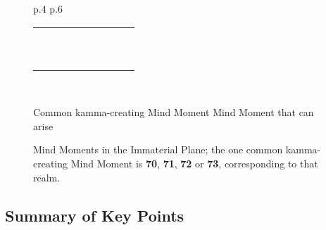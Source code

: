 \begin{figure}[H]
\begin{tabular}{L{\dimexpr.4\tabcolsep} R{\dimexpr.6\tabcolsep}}
\begin{tabular}{p{} p{}
p{}
R{.077\textwidth} |
p{.039\textwidth}
p{.039\textwidth}
p{.039\textwidth}
p{.039\textwidth}
p{.039\textwidth}}
\\
& &  &  & \tm & \tm & \tm & \tm & \tm
\\
& &  &  & & & & & \tm
\\\midrule
{} &  &  &  & \tm & & & &
\\
& &  &  & & \tm & & &
\\
& &  &  & & & \tm & &
\\
& &  &  & & & & \tm &
\\
&  &  &  & & \tm & & &
\\
& &  &  & & & \tm & &
\\
& &  &  & & & & \tm &
\\
& &  &  & & & & & \tm
\\
\bottomrule
\end{tabular}
\\
\end{tabular}
\begin{center}
\tmcommon\hspace{2mm} Common kamma-creating Mind Moment \hspace{5mm} \tm\hspace{2mm} Mind Moment that can arise
\end{center}
\caption{Mind Moments in the Immaterial Plane; the one common kamma-creating Mind Moment is \textbf{70}, \textbf{71}, \textbf{72} or \textbf{73}, corresponding to that realm.}
\label{fig:Immaterial}
\end{figure}

\pagebreak

\subsection*{Summary of Key Points}


